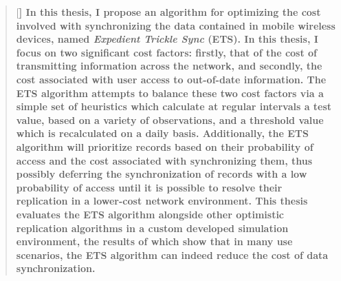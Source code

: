 
\begin{abstract}[\normalfont\large\bfseries]
In this thesis, I propose an algorithm for optimizing the cost involved with synchronizing the data contained in mobile wireless devices, named \emph{Expedient Trickle Sync} (ETS).  In this thesis, I focus on two significant cost factors: firstly, that of the cost of transmitting information across the network, and secondly, the cost associated with user access to out-of-date information.  The ETS algorithm attempts to balance these two cost factors via a simple set of heuristics which calculate at regular intervals a test value, based on a variety of observations, and a threshold value which is recalculated on a daily basis.  Additionally, the ETS algorithm will prioritize records based on their probability of access and the cost associated with synchronizing them, thus possibly deferring the synchronization of records with a low probability of access until it is possible to resolve their replication in a lower-cost network environment.  This thesis evaluates the ETS algorithm alongside other optimistic replication algorithms in a custom developed simulation environment, the results of which show that in many use scenarios, the ETS algorithm can indeed reduce the cost of data synchronization.
\end{abstract}
